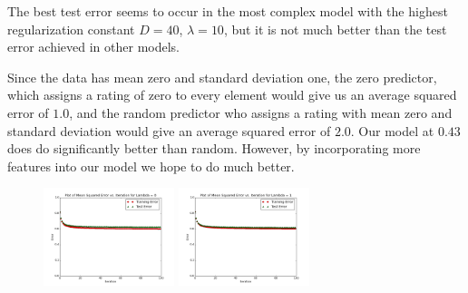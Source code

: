 \documentclass[12pt]{article}
\newcommand{\plotwidth}{0.34}
\begin{document}
The best test error seems to occur in the most complex model with the highest regularization constant $D=40$, $\lambda = 10$, but it is not much better than the test error achieved in other models.

Since the data has mean zero and standard deviation one, the zero predictor, which assigns a rating of zero to every element would give us an average squared error of $1.0$, and the random predictor who assigns a rating with mean zero and standard deviation would give an average squared error of $2.0$. Our model at $0.43$ does do significantly better than random. However, by incorporating more features into our model we hope to do much better.

	\begin{figure}[H]
	\centering
	\includegraphics[width=\plotwidth\textwidth]{plots/test-i100d1l0.png}
	\includegraphics[width=\plotwidth\textwidth]{plots/test-i100d1l1.png}

\end{figure}
\end{document}
